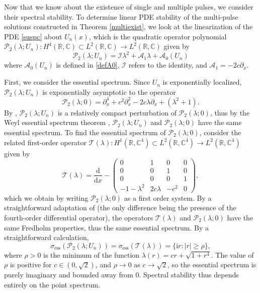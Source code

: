 \documentclass[review,onefignum,onetabnum]{siamart171218}
\newcommand{\C}{\mathbb{C}}
\newcommand{\R}{\mathbb{R}}
\newcommand{\rmd}{\mathrm{d}}
\newcommand{\rmi}{\mathrm{i}}
\newcommand{\calA}{\mathcal{A}}
\newcommand{\calI}{\mathcal{I}}
\newcommand{\calP}{\mathcal{P}}
\newcommand{\calT}{\mathcal{T}}
\begin{document}
Now that we know about the existence of single and multiple pulses, we consider their spectral stability. To determine linear PDE stability of the multi-pulse solutions constructed in Theorem \ref{multiexist}, we look at the linearization of the PDE \cref{suspc} about $U_n(x)$, which is the quadratic operator polynomial $\calP_2(\lambda; U_n): H^4(\R, \C) \subset L^2(\R,\C) \rightarrow L^2(\R,\C)$ given by
\begin{equation}\label{quadeig}
\calP_2(\lambda; U_n) = \calI \lambda^2 + \calA_1 \lambda + \calA_0(U_n)
\end{equation}
where $\calA_0(U_n)$ is defined in \cref{defA0}, $\calI$ refers to the identity, and $\calA_1=-2 c \partial_x$.

First, we consider the essential spectrum. Since $U_n$ is exponentially localized, $\calP_2(\lambda; U_n)$ is exponentially asymptotic to the operator
\begin{equation}\label{quadeig0}
\calP_2(\lambda; 0) = \partial_x^4 + c^2 \partial_x^2 - 2 c \lambda \partial_x + (\lambda^2 + 1).
\end{equation}
By \cite[Theorem~3.1.11]{kapitula:sad13}, $\calP_2(\lambda; U_n)$ is a relatively compact perturbation of $\calP_2(\lambda; 0)$, thus by the Weyl essential spectrum theorem \cite[Theorem~2.2.6]{kapitula:sad13}, $\calP_2(\lambda; U_n)$ and $\calP_2(\lambda; 0)$ have the same essential spectrum. To find the essential spectrum of $\calP_2(\lambda; 0)$, consider the related first-order operator $\calT(\lambda): H^1(\R, \C^4) \subset L^2(\R,\C^4) \rightarrow L^2(\R,\C^4)$ given by
\begin{equation}
\calT(\lambda) = \frac{\rmd}{\rmd x} - \begin{pmatrix}
0 & 1 & 0 & 0 \\
0 & 0 & 1 & 0 \\
0 & 0 & 0 & 1 \\
-1 - \lambda^2 & 2 c \lambda & -c^2 & 0
\end{pmatrix},
\end{equation}
which we obtain by writing $\calP_2(\lambda; 0)$ as a first order system. By a straightforward adaptation of \cite[Theorem A.1]{sandstede:rmi08} (the only difference being the presence of the fourth-order differential operator), the operators $\calT(\lambda)$ and $\calP_2(\lambda; 0)$ have the same Fredholm properties, thus the same essential spectrum. By a straightforward calculation,
\begin{equation}\label{quadess}
\sigma_{\mathrm{ess}}(\calP_2(\lambda; U_n)) = \sigma_{\mathrm{ess}}(\calT(\lambda)) = \{\rmi r : |r| \geq \rho \},
\end{equation}
where $\rho > 0$ is the minimum of the function $\lambda(r) = c r + \sqrt{1 + r^4}$. The value of $\rho$ is positive for $c \in (0, \sqrt{2})$, and $\rho\to0$ as $c\to\sqrt{2}$, so the essential spectrum is purely imaginary and bounded away from 0. Spectral stability thus depends entirely on the point spectrum.
\end{document}
